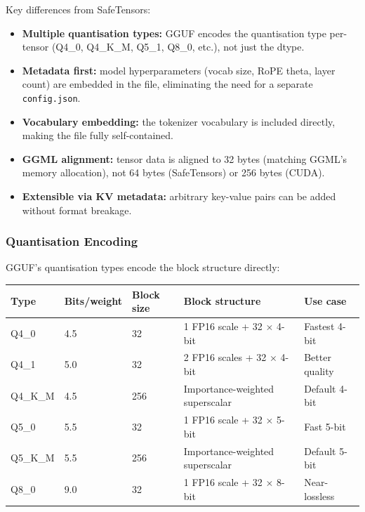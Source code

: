 \documentclass[11pt,a4paper]{article}
\theoremstyle{definition}
\begin{document}
Key differences from SafeTensors:
\begin{itemize}
	\item \textbf{Multiple quantisation types:} GGUF encodes the quantisation type per-tensor (Q4\_0, Q4\_K\_M, Q5\_1, Q8\_0, etc.), not just the dtype.
	\item \textbf{Metadata first:} model hyperparameters (vocab size, RoPE theta, layer count) are embedded in the file, eliminating the need for a separate \texttt{config.json}.
	\item \textbf{Vocabulary embedding:} the tokenizer vocabulary is included directly, making the file fully self-contained.
	\item \textbf{GGML alignment:} tensor data is aligned to 32 bytes (matching GGML's memory allocation), not 64 bytes (SafeTensors) or 256 bytes (CUDA).
	\item \textbf{Extensible via KV metadata:} arbitrary key-value pairs can be added without format breakage.
\end{itemize}

\subsubsection{Quantisation Encoding}

GGUF's quantisation types encode the block structure directly:

\begin{longtable}{p{2.5cm}p{3cm}p{3cm}p{3cm}p{3cm}}
	\toprule
	\textbf{Type} & \textbf{Bits/weight} & \textbf{Block size} & \textbf{Block structure}          & \textbf{Use case} \\
	\midrule
	Q4\_0         & 4.5                  & 32                  & 1 FP16 scale + 32 $\times$ 4-bit  & Fastest 4-bit     \\
	Q4\_1         & 5.0                  & 32                  & 2 FP16 scales + 32 $\times$ 4-bit & Better quality    \\
	Q4\_K\_M      & 4.5                  & 256                 & Importance-weighted superscalar   & Default 4-bit     \\
	Q5\_0         & 5.5                  & 32                  & 1 FP16 scale + 32 $\times$ 5-bit  & Fast 5-bit        \\
	Q5\_K\_M      & 5.5                  & 256                 & Importance-weighted superscalar   & Default 5-bit     \\
	Q8\_0         & 9.0                  & 32                  & 1 FP16 scale + 32 $\times$ 8-bit  & Near-lossless     \\
	\bottomrule
\end{longtable}
\end{document}
